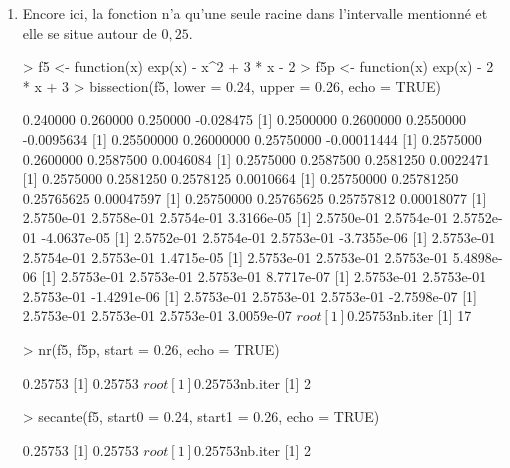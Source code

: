 \begin{exercice}
\begin{sol}
\begin{enumerate}
\begin{Schunk}
\end{Schunk}
    \item Encore ici, la fonction n'a qu'une seule racine dans
      l'intervalle mentionné et elle se situe autour de $0,25$.
\begin{Schunk}
\begin{Sinput}
> f5 <- function(x) exp(x) - x^2 + 3 * x - 2
> f5p <- function(x) exp(x) - 2 * x + 3
> bissection(f5, lower = 0.24, upper = 0.26, echo = TRUE)
\end{Sinput}
\begin{Soutput}
[1]  0.240000  0.260000  0.250000 -0.028475
[1]  0.2500000  0.2600000  0.2550000 -0.0095634
[1]  0.25500000  0.26000000  0.25750000 -0.00011444
[1] 0.2575000 0.2600000 0.2587500 0.0046084
[1] 0.2575000 0.2587500 0.2581250 0.0022471
[1] 0.2575000 0.2581250 0.2578125 0.0010664
[1] 0.25750000 0.25781250 0.25765625 0.00047597
[1] 0.25750000 0.25765625 0.25757812 0.00018077
[1] 2.5750e-01 2.5758e-01 2.5754e-01 3.3166e-05
[1]  2.5750e-01  2.5754e-01  2.5752e-01 -4.0637e-05
[1]  2.5752e-01  2.5754e-01  2.5753e-01 -3.7355e-06
[1] 2.5753e-01 2.5754e-01 2.5753e-01 1.4715e-05
[1] 2.5753e-01 2.5753e-01 2.5753e-01 5.4898e-06
[1] 2.5753e-01 2.5753e-01 2.5753e-01 8.7717e-07
[1]  2.5753e-01  2.5753e-01  2.5753e-01 -1.4291e-06
[1]  2.5753e-01  2.5753e-01  2.5753e-01 -2.7598e-07
[1] 2.5753e-01 2.5753e-01 2.5753e-01 3.0059e-07
$root
[1] 0.25753

$nb.iter
[1] 17
\end{Soutput}
\begin{Sinput}
> nr(f5, f5p, start = 0.26, echo = TRUE)
\end{Sinput}
\begin{Soutput}
[1] 0.25753
[1] 0.25753
$root
[1] 0.25753

$nb.iter
[1] 2
\end{Soutput}
\begin{Sinput}
> secante(f5, start0 = 0.24, start1 = 0.26, echo = TRUE)
\end{Sinput}
\begin{Soutput}
[1] 0.25753
[1] 0.25753
$root
[1] 0.25753

$nb.iter
[1] 2
\end{Soutput}
\end{Schunk}
    \end{enumerate}
  \end{sol}
\end{exercice}

